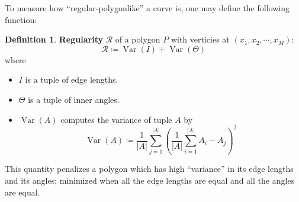 \documentclass[a4paper, 11pt]{article}
\DeclareMathOperator{\Var}{Var}
\theoremstyle{definition}
\newtheorem{definition}{Definition}
\theoremstyle{remark}
\begin{document}
To measure how ``regular-polygonlike'' a curve is, one may define the following function:
\begin{definition}
    \textbf{Regularity} $\mathcal{R}$ of a polygon $P$ with verticies at $\left( x_1, x_2, \cdots, x_M \right)$:
    \begin{equation}
        \mathcal{R} \coloneqq \Var \left( I \right) + \Var \left( \Theta \right)
    \end{equation}
    where
    \begin{itemize}
        \item $I$ is a tuple of edge lengths.
        \item $\Theta$ is a tuple of inner angles.
        \item $\Var (A)$ computes the variance of tuple $A$ by
            \begin{equation}
                \Var (A) \coloneqq \frac{1}{|A|} \sum_{j = 1}^{|A|} \left( \frac{1}{|A|} \sum_{i = 1}^{|A|} A_i - A_j \right)^2
            \end{equation}
    \end{itemize}
    This quantity penalizes a polygon which has high ``variance'' in its edge lengths and its angles;
    minimized when all the edge lengths are equal and all the angles are equal.
\end{definition}
\end{document}
